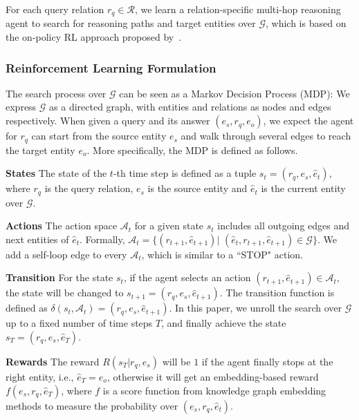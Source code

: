 \documentclass[11pt,a4paper]{article}
\begin{document}
For each query relation $r_q \in \mathcal{R}$, we learn a relation-specific multi-hop reasoning agent to search for reasoning paths and target entities over $\mathcal{G}$, which is based on the on-policy RL approach proposed by~\citet{MultiHop}. 

\subsubsection{Reinforcement Learning Formulation}

The search process over $\mathcal{G}$ can be seen as a Markov Decision Process (MDP): We express $\mathcal{G}$ as a directed graph, with entities and relations as nodes and edges respectively. When given a query and its answer $(e_s, r_q, e_o)$, we expect the agent for $r_q$ can start from the source entity $e_s$ and walk through several edges to reach the target entity $e_o$. More specifically, the MDP is defined as follows.

\textbf{States} \quad The state of the $t$-th time step is defined as a tuple $s_t = (r_q, e_s, \hat{e}_t)$, where $r_q$ is the query relation, $e_s$ is the source entity and $\hat{e}_t$ is the current entity over $\mathcal{G}$. 

\textbf{Actions} \quad The action space $\mathcal{A}_t$ for a given state $s_t$ includes all outgoing edges and next entities of $\hat{e}_t$. Formally, $\mathcal{A}_t = \{(r_{t+1}, \hat{e}_{t+1})|$ $ (\hat{e}_t, r_{t+1}, \hat{e}_{t+1}) \in \mathcal{G}\}$. We add a self-loop edge to every $\mathcal{A}_t$, which is similar to a ``STOP" action.


\textbf{Transition} \quad For the state $s_t$, if the agent selects an action $(r_{t+1}, \hat{e}_{t+1}) \in \mathcal{A}_t$, the state will be changed to $s_{t+1} = (r_q, e_s, \hat{e}_{t+1})$. The transition function is defined as $\delta(s_t, \mathcal{A}_t) = (r_q, e_s, \hat{e}_{t+1})$. 
In this paper, we unroll the search over $\mathcal{G}$ up to a fixed number of time steps $T$, and finally achieve the state $s_{T} = (r_q, e_s, \hat{e}_{T})$. 

\textbf{Rewards} \quad The reward $R(s_{T}|r_q, e_s)$ will be $1$ if the agent finally stops at the right entity, i.e., $\hat{e}_{T} = e_o$, otherwise it will get an embedding-based reward $f(e_s, r_q, \hat{e}_T)$, where $f$ is a score function from knowledge graph embedding methods to measure the probability over $(e_s, r_q, \hat{e}_t)$.
\end{document}

